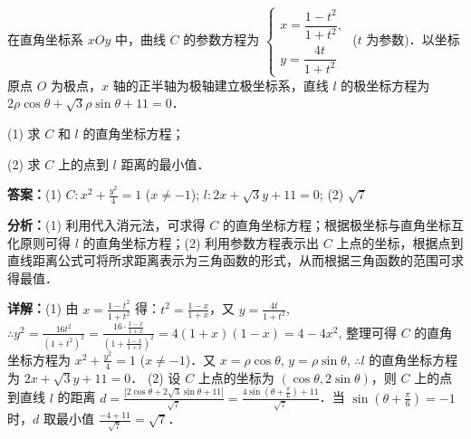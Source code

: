 \begin{question}[points=10]
[选修 4—4：坐标系与参数方程]

在直角坐标系 $xOy$ 中，曲线 $C$ 的参数方程为 $\begin{cases} x = \dfrac{1 - t^2}{1 + t^2}, \\ y = \dfrac{4t}{1 + t^2} \end{cases}$ ($t$ 为参数)．以坐标原点 $O$ 为极点，$x$ 轴的正半轴为极轴建立极坐标系，直线 $l$ 的极坐标方程为 $2\rho\cos\theta + \sqrt{3}\rho\sin\theta + 11 = 0$．

(1) 求 $C$ 和 $l$ 的直角坐标方程；

(2) 求 $C$ 上的点到 $l$ 距离的最小值．
\begin{solution}
\textbf{答案：}(1) $C: x^2 + \frac{y^2}{4} = 1$ ($x \neq -1$); $l: 2x + \sqrt{3}y + 11 = 0$; (2) $\sqrt{7}$

\textbf{分析：}(1) 利用代入消元法，可求得 $C$ 的直角坐标方程；根据极坐标与直角坐标互化原则可得 $l$ 的直角坐标方程；(2) 利用参数方程表示出 $C$ 上点的坐标，根据点到直线距离公式可将所求距离表示为三角函数的形式，从而根据三角函数的范围可求得最值．

\textbf{详解：}(1) 由 $x = \frac{1 - t^2}{1 + t^2}$ 得：$t^2 = \frac{1 - x}{1 + x}$，又 $y = \frac{4t}{1 + t^2}$, $\therefore y^2 = \frac{16t^2}{(1 + t^2)^2} = \frac{16 \cdot \frac{1-x}{1+x}}{\left(1 + \frac{1-x}{1+x}\right)^2} = 4(1+x)(1-x) = 4 - 4x^2$, 整理可得 $C$ 的直角坐标方程为 $x^2 + \frac{y^2}{4} = 1$ ($x \neq -1$)．又 $x = \rho\cos\theta$, $y = \rho\sin\theta$, $\therefore l$ 的直角坐标方程为 $2x + \sqrt{3}y + 11 = 0$．
(2) 设 $C$ 上点的坐标为 $(\cos\theta, 2\sin\theta)$，则 $C$ 上的点到直线 $l$ 的距离 $d = \frac{|2\cos\theta + 2\sqrt{3}\sin\theta + 11|}{\sqrt{7}} = \frac{4\sin\left(\theta + \frac{\pi}{6}\right) + 11}{\sqrt{7}}$．当 $\sin\left(\theta + \frac{\pi}{6}\right) = -1$ 时，$d$ 取最小值 $\frac{-4 + 11}{\sqrt{7}} = \sqrt{7}$．
\end{solution}
\end{question}

